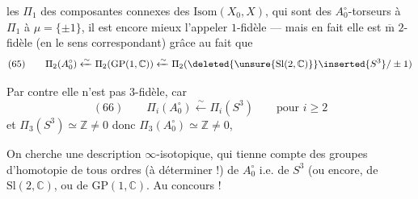 les $\Pi_1$  des composantes connexes des 
$\mathrm{Isom}(X_0,X)$, qui sont des $A_0^\circ$-torseurs
 à $\Pi_1$  à $\mu=\{\pm1\}$, il est
encore mieux l'appeler $1$-fidèle ---
mais en fait elle est $\overline{\mathrm m}$ $2$-fidèle
(en le sens correspondant) grâce au
fait que
\[
(65)\qquad
\Pi_2(A_0^\circ)\xleftarrow{\sim}\Pi_2(\mathrm{GP}(1,\mathbb C))
\xleftarrow{\sim}\Pi_2(\deleted{\unsure{\mathrm{Sl}(2,\mathbb C)}}\inserted{S^3}/\pm1)
\]

Par contre elle n'est pas $3$-fidèle, car
\[
(66)\qquad \Pi_i(A_0^\circ)\xleftarrow{\sim}\Pi_i(S^3)
\qquad\text{pour }i\geq2
\]
et $\Pi_3(S^3)\simeq\mathbb Z\ne0$ donc $\Pi_3(A_0^\circ)\simeq\mathbb Z\ne0$,

On cherche une description $\infty$-isotopique,
qui tienne compte des groupes d'homotopie
de tous ordres (à déterminer !) de
$A_0^\circ$ i.e. de $S^3$ (ou encore, de $\mathrm{Sl}(2,\mathbb C)$,
ou de $\mathrm{GP}(1,\mathbb C)$. Au concours !

